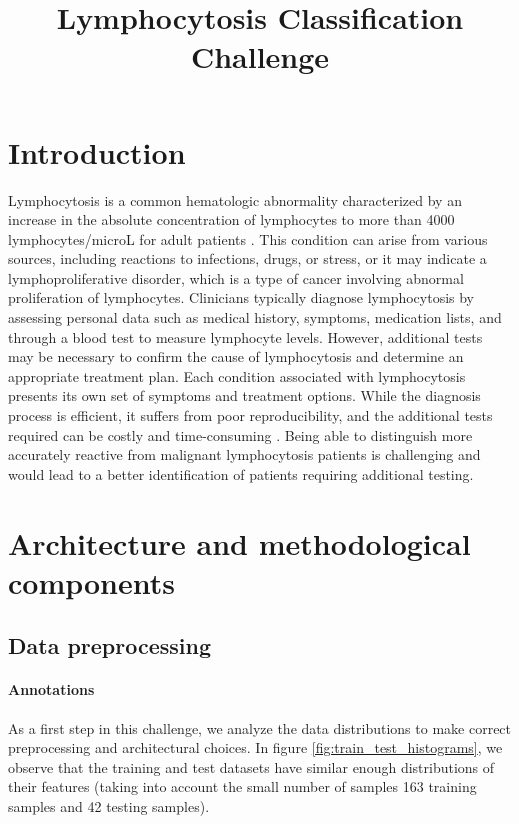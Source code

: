 \documentclass{midl}
\title[DLMI]{Lymphocytosis Classification Challenge}
\begin{document}
\maketitle

\begin{abstract}
\end{abstract}

\section{Introduction}
\label{sec:introduction}

Lymphocytosis is a common hematologic abnormality characterized by an increase in the absolute concentration of lymphocytes to more than 4000 lymphocytes/microL for adult patients \cite{Hamad_2023}. This condition can arise from various sources, including reactions to infections, drugs, or stress, or it may indicate a lymphoproliferative disorder, which is a type of cancer involving abnormal proliferation of lymphocytes. Clinicians typically diagnose lymphocytosis by assessing personal data such as medical history, symptoms, medication lists, and through a blood test to measure lymphocyte levels. However, additional tests may be necessary to confirm the cause of lymphocytosis and determine an appropriate treatment plan. Each condition associated with lymphocytosis presents its own set of symptoms and treatment options. While the diagnosis process is efficient, it suffers from poor reproducibility, and the additional tests required can be costly and time-consuming \cite{Sahasrabudhe_2021}. Being able to distinguish more accurately reactive from malignant lymphocytosis patients is challenging and would lead to a better identification of patients requiring additional testing.

\section{Architecture and methodological components}
\label{sec:methodology}

\subsection{Data preprocessing}

\paragraph*{Annotations}
As a first step in this challenge, we analyze the data distributions to make correct preprocessing and architectural choices. In figure \ref{fig:train_test_histograms}, we observe that the training and test datasets have similar enough distributions of their features (taking into account the small number of samples 163 training samples and 42 testing samples).
\end{document}
